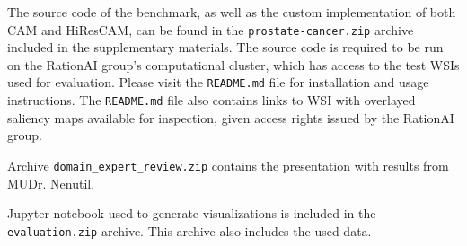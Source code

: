 The source code of the benchmark, as well as the custom implementation of both CAM and HiResCAM, can be found in the \texttt{prostate-cancer.zip} archive included in the supplementary materials. The source code is required to be run on the RationAI group's computational cluster, which has access to the test WSIs used for evaluation. Please visit the \texttt{README.md} file for installation and usage instructions. The \texttt{README.md} file also contains links to WSI with overlayed saliency maps available for inspection, given access rights issued by the RationAI group.

Archive \texttt{domain\_expert\_review.zip} contains the presentation with results from MUDr. Nenutil.

Jupyter notebook used to generate visualizations is included in the \texttt{evaluation.zip} archive. This archive also includes the used data.
